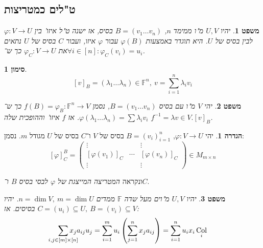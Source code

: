\documentclass[]{article}
\DeclareMathOperator{\col}    {Col}
\newcommand\F         {\mathbb{F}}
\newcommand\co        {\colon}
\newcommand\pms[1]    {\begin{pmatrix}
		#1
\end{pmatrix}}
\renewcommand\lg      {\lambda}
\newcommand\op    {^{-1}}
\newcommand\cl [1]    {\left ( #1 \right )}
\renewcommand\phi     {\varphi}
\newtheorem{Theorem}{משפט}
\theoremstyle{definition}
\newtheorem{definition}{הגדרה}
\newtheorem{Notion}{סימון}
\newcommand\theo  [1] {\begin{Theorem}#1\end{Theorem}}
\newcommand\defi  [1] {\begin{definition}#1\end{definition}}
\newcommand\noti  [1] {\begin{Notion}#1\end{Notion}}
\begin{document}
\begin{multicols}{2}
		\section{ט"לים כמטריצות}
		\theo{יהיו $U, V$ מ"ו ממימד $n$, $B = (v_1 \dots v_n)$ בסיס, אז ישנה ט"ל איזו' בין $\phi \co V \to U$ לבין בסיס של $U$. היא תוגדר באמצעות $\phi(B)$ עבור $\phi$ איזו, ועבור $C$ בסיס של $U$ נתאים את $\phi_C \co V \to U$ כך ש־$\forall i \in [n] \co \phi_C(v_i) = u_i$. }
		\noti{
		\[ [v]_B = (\lg_1 \dots \lg_n) \in \F^n, \ v = \sum_{i = 1}^{n}\lg_iv_i \]}
		\theo{יהי $V$ מ"ו עם בסיס $B = (v_1 \dots v_n)$, נסמן $f(B) = \phi_B \co \F^n \to V$ כך ש־$\phi(\lg_1 \dots \lg_n) = \sum \lg_iv_i$. אז $f$ איזו' וההופכית שלה $f\op = \lg v \in V . [v]_B$.}
		\defi{יהי $\phi \co V \to U$, $B = (v_i)^n_{i = 1}$ בסיס של $V$ ו־$C$ בסיס של $U$ מגודל $m$. נסמן: 
		\[ [\phi]^B_C = \pms{\vdots & & \vdots \\ [\phi(v_1)]_C & \cdots & [\phi(v_n)]_C \\ \vdots & & \vdots} \in M_{m \times n} \]}
		ונקראה \textit{המטריצה המייצגת של $\phi$ לבסי בסיס $B$ ו־$C$}. 
		\theo{יהיו $U, V$ מ"וים מעל שדה $\F$ ממדים $n = \dim V, \ m = \dim U$. יהיו $C = (u_i) \subseteq U, \ B = (v_i) \subseteq V$ בסיסים. אז: 
		\[ \sum_{\mathclap{i, j \in [m] \times [n]}}x_ja_{ij}u_j = \sum_{i = 1}^{m}u_i \cl{\sum_{j = 1}^{n}x_ja_{ij}} = \sum_{i = 1}^{n}u_ix_i\col_i \]}
		

\end{multicols}
\end{document}

